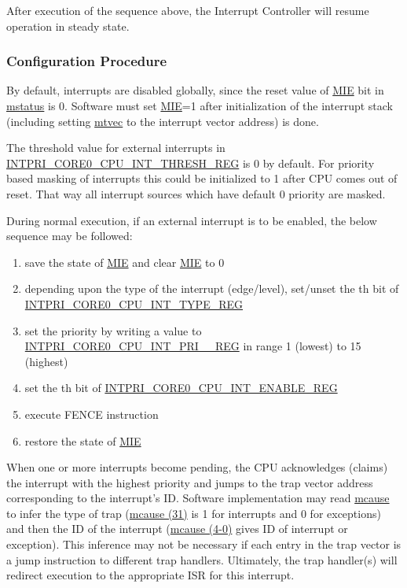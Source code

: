 \documentclass[main\_\_EN.tex]{subfiles}
\begin{document}
After execution of the sequence above, the Interrupt Controller will resume operation in steady state.

\subsubsection{Configuration Procedure}
\label{sec:riscvcpu-int-config}

By default, interrupts are disabled globally, since the reset value of \hyperref[fielddesc:MSTATUSMIE]{MIE} bit in \hyperref[regdesc:MSTATUS]{mstatus} is 0. Software must set \hyperref[fielddesc:MSTATUSMIE]{MIE}=1 after initialization of the interrupt stack (including setting \hyperref[regdesc:MTVEC]{mtvec} to the interrupt vector address) is done.

The threshold value for external interrupts in \hyperref[regdesc:INTPRICORE0CPUINTTHRESHREG]{INTPRI\_CORE0\_CPU\_INT\_THRESH\_REG} is 0 by default. For priority based masking of interrupts this could be initialized to 1 after CPU comes out of reset. That way all interrupt sources which have default 0 priority are masked.

During normal execution, if an external interrupt  is to be enabled, the below sequence may be followed:
\begin{enumerate}
    \item save the state of \hyperref[fielddesc:MSTATUSMIE]{MIE} and clear \hyperref[fielddesc:MSTATUSMIE]{MIE} to 0
    \item depending upon the type of the interrupt (edge/level), set/unset the th bit of \hyperref[regdesc:INTPRICORE0CPUINTTYPEREG]{INTPRI\_CORE0\_CPU\_INT\_TYPE\_REG}
    \item set the priority by writing a value to \hyperref[regdesc:INTPRICORE0CPUINTPRINREG]{INTPRI\_CORE0\_CPU\_INT\_PRI\_\_REG} in range 1 (lowest) to 15 (highest)
    \item set the th bit of \hyperref[regdesc:INTPRICORE0CPUINTENABLEREG]{INTPRI\_CORE0\_CPU\_INT\_ENABLE\_REG}
    \item execute FENCE instruction
    \item restore the state of \hyperref[fielddesc:MSTATUSMIE]{MIE}
\end{enumerate}

When one or more interrupts become pending, the CPU acknowledges (claims) the interrupt with the highest priority and jumps to the trap vector address corresponding to the interrupt's ID. Software implementation may read \hyperref[regdesc:MCAUSE]{mcause} to infer the type of trap (\hyperref[fielddesc:MCAUSEINT]{mcause (31)} is 1 for interrupts and 0 for exceptions) and then the ID of the interrupt (\hyperref[fielddesc:MCAUSECODE]{mcause (4-0)} gives ID of interrupt or exception). This inference may not be necessary if each entry in the trap vector is a jump instruction to different trap handlers. Ultimately, the trap handler(s) will redirect execution to the appropriate ISR for this interrupt.
\end{document}

